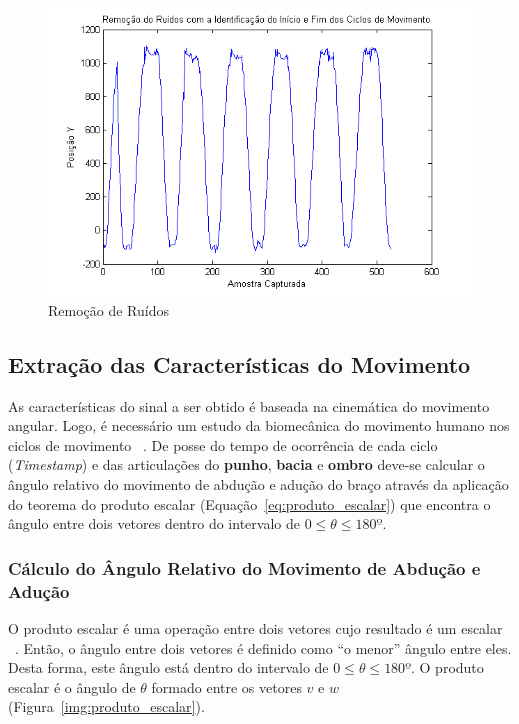 \begin{figure}[!htb]
     \centering
     \includegraphics[width=1\textwidth]{./img/remocaoruidociclo.png}
     \caption{Remoção de Ruídos}
     \label{img:remocaoruidossinal}
\end{figure}


\subsection{Extração das Características do Movimento} \label{sec:extracao_caracteristcas}
As características do sinal a ser obtido é baseada na cinemática do movimento angular. Logo, é necessário um estudo da biomecânica do movimento humano nos ciclos de movimento ~\cite{hamill1999bases}. De posse do tempo de ocorrência de cada ciclo (\textit{Timestamp}) e das articulações do \textbf{punho}, \textbf{bacia} e \textbf{ombro} deve-se calcular o ângulo relativo do movimento de abdução e adução do braço através da aplicação do teorema do produto escalar (Equação~\ref{eq:produto_escalar}) que encontra o ângulo entre dois vetores dentro do intervalo de $0 \leq \theta \leq 180º$.

\subsubsection{Cálculo do Ângulo Relativo do Movimento de Abdução e Adução}\label{section:movimento_abducao}
O produto escalar é uma operação entre dois vetores cujo resultado é um escalar ~\cite{algebra90}. Então, o ângulo entre dois vetores é definido como ``o menor'' ângulo entre eles. Desta forma, este ângulo está dentro do intervalo de $0 \leq \theta \leq 180º $. O produto escalar é o ângulo de $ \theta$ formado entre os vetores $ v $ e $ w $ (Figura~\ref{img:produto_escalar}).


